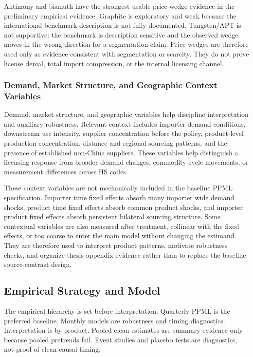 \documentclass[12pt,a4paper]{article}
\numberwithin{equation}{section}
\begin{document}
Antimony and bismuth have the strongest usable price-wedge evidence in the preliminary empirical evidence. Graphite is exploratory and weak because the international benchmark description is not fully documented. Tungsten/APT is not supportive: the benchmark is description sensitive and the observed wedge moves in the wrong direction for a segmentation claim. Price wedges are therefore used only as evidence consistent with segmentation or scarcity. They do not prove license denial, total import compression, or the internal licensing channel.

\subsubsection{Demand, Market Structure, and Geographic Context Variables}

Demand, market structure, and geographic variables help discipline interpretation and auxiliary robustness. Relevant context includes importer demand conditions, downstream use intensity, supplier concentration before the policy, product-level production concentration, distance and regional sourcing patterns, and the presence of established non-China suppliers. These variables help distinguish a licensing response from broader demand changes, commodity cycle movements, or measurement differences across HS codes.

These context variables are not mechanically included in the baseline PPML specification. Importer time fixed effects absorb many importer wide demand shocks, product time fixed effects absorb common product shocks, and importer product fixed effects absorb persistent bilateral sourcing structure. Some contextual variables are also measured after treatment, collinear with the fixed effects, or too coarse to enter the main model without changing the estimand. They are therefore used to interpret product patterns, motivate robustness checks, and organize thesis appendix evidence rather than to replace the baseline source-contrast design.

\subsection{Empirical Strategy and Model}

The empirical hierarchy is set before interpretation. Quarterly PPML is the preferred baseline. Monthly models are robustness and timing diagnostics. Interpretation is by product. Pooled clean estimates are summary evidence only because pooled pretrends fail. Event studies and placebo tests are diagnostics, not proof of clean causal timing.
\end{document}
